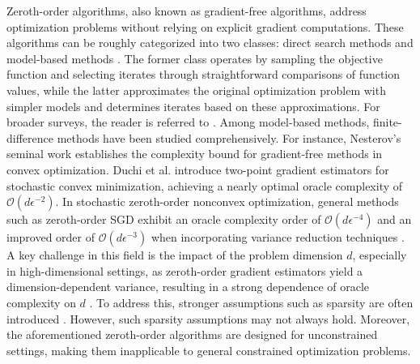 \documentclass[11pt]{article}
\numberwithin{equation}{section}
\begin{document}
Zeroth-order algorithms, also known as gradient-free algorithms, address optimization problems without relying on explicit gradient computations. These algorithms can be roughly  categorized into two classes: direct search methods \cite{hooke1961direct,nelder1965simplex,rosenbrock1960automatic} and model-based methods \cite{billups2013derivative,conn2008geometry2,powell2001lagrange}. The former class operates by sampling the objective function and selecting iterates through straightforward comparisons of function values, while the latter approximates the original optimization problem with simpler models and determines iterates based on these approximations. For broader surveys, the reader is referred to \cite{conn2009introduction,larson2019derivative}.  Among model-based methods, finite-difference methods have been studied comprehensively.  
For instance, Nesterov's seminal work \cite{Nesterov17} establishes the complexity bound for gradient-free methods in convex optimization. Duchi et al. \cite{duchi2015optimal} introduce two-point gradient estimators for stochastic convex minimization, achieving a nearly optimal oracle complexity of $\mathcal{O}(d\epsilon^{-2})$.  
In stochastic zeroth-order nonconvex optimization, general methods such as zeroth-order SGD \cite{sgd} exhibit an oracle complexity order of $\mathcal{O}(d\epsilon^{-4})$ and an improved order of   $\mathcal{O}(d\epsilon^{-3})$ when  incorporating variance reduction techniques \cite{spider, huang2020accelerated, JWZL}. 
A key challenge in this field is the impact of the problem dimension \(d\), especially in high-dimensional settings, as zeroth-order gradient estimators yield a
dimension-dependent variance, resulting in a strong dependence of oracle complexity on $d$ \cite{liu2020primer,ma2025revisiting}. To address this, stronger assumptions such as sparsity are often introduced \cite{BG22,roy2022stochastic,wang2018stochastic}. 
However, such sparsity assumptions may not always hold. 
Moreover, the aforementioned zeroth-order algorithms are designed for unconstrained settings, making them inapplicable to general constrained optimization problems. 
\end{document}
